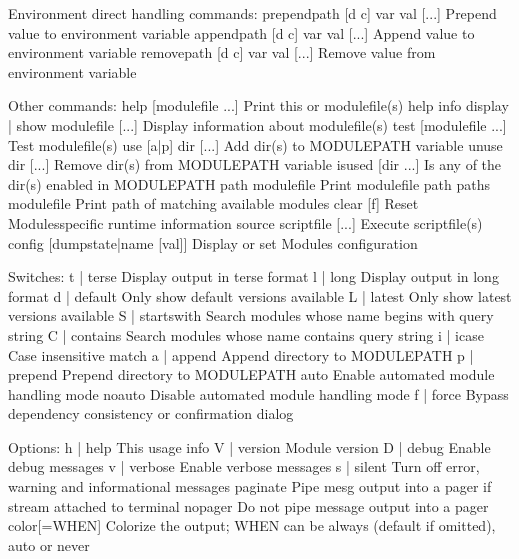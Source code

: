 \documentclass[a4paper,11pt,english]{sphinxmanual}
\begin{document}
\begin{sphinxVerbatim}[commandchars=\\\{\}]
Environment direct handling commands:
  prepend\PYGZhy{}path [\PYGZhy{}d c] var val [...] Prepend value to environment variable
  append\PYGZhy{}path [\PYGZhy{}d c] var val [...]  Append value to environment variable
  remove\PYGZhy{}path [\PYGZhy{}d c] var val [...]  Remove value from environment variable

Other commands:
  help            [modulefile ...]  Print this or modulefile(s) help info
  display | show  modulefile [...]  Display information about modulefile(s)
  test            [modulefile ...]  Test modulefile(s)
  use     [\PYGZhy{}a|\PYGZhy{}p] dir [...]         Add dir(s) to MODULEPATH variable
  unuse           dir [...]         Remove dir(s) from MODULEPATH variable
  is\PYGZhy{}used         [dir ...]         Is any of the dir(s) enabled in MODULEPATH
  path            modulefile        Print modulefile path
  paths           modulefile        Print path of matching available modules
  clear           [\PYGZhy{}f]              Reset Modules\PYGZhy{}specific runtime information
  source          scriptfile [...]  Execute scriptfile(s)
  config [\PYGZhy{}\PYGZhy{}dump\PYGZhy{}state|name [val]]  Display or set Modules configuration

Switches:
  \PYGZhy{}t | \PYGZhy{}\PYGZhy{}terse    Display output in terse format
  \PYGZhy{}l | \PYGZhy{}\PYGZhy{}long     Display output in long format
  \PYGZhy{}d | \PYGZhy{}\PYGZhy{}default  Only show default versions available
  \PYGZhy{}L | \PYGZhy{}\PYGZhy{}latest   Only show latest versions available
  \PYGZhy{}S | \PYGZhy{}\PYGZhy{}starts\PYGZhy{}with
                  Search modules whose name begins with query string
  \PYGZhy{}C | \PYGZhy{}\PYGZhy{}contains Search modules whose name contains query string
  \PYGZhy{}i | \PYGZhy{}\PYGZhy{}icase    Case insensitive match
  \PYGZhy{}a | \PYGZhy{}\PYGZhy{}append   Append directory to MODULEPATH
  \PYGZhy{}p | \PYGZhy{}\PYGZhy{}prepend  Prepend directory to MODULEPATH
  \PYGZhy{}\PYGZhy{}auto          Enable automated module handling mode
  \PYGZhy{}\PYGZhy{}no\PYGZhy{}auto       Disable automated module handling mode
  \PYGZhy{}f | \PYGZhy{}\PYGZhy{}force    By\PYGZhy{}pass dependency consistency or confirmation dialog

Options:
  \PYGZhy{}h | \PYGZhy{}\PYGZhy{}help     This usage info
  \PYGZhy{}V | \PYGZhy{}\PYGZhy{}version  Module version
  \PYGZhy{}D | \PYGZhy{}\PYGZhy{}debug    Enable debug messages
  \PYGZhy{}v | \PYGZhy{}\PYGZhy{}verbose  Enable verbose messages
  \PYGZhy{}s | \PYGZhy{}\PYGZhy{}silent   Turn off error, warning and informational messages
  \PYGZhy{}\PYGZhy{}paginate      Pipe mesg output into a pager if stream attached to terminal
  \PYGZhy{}\PYGZhy{}no\PYGZhy{}pager      Do not pipe message output into a pager
  \PYGZhy{}\PYGZhy{}color[=WHEN]  Colorize the output; WHEN can be \PYGZsq{}always\PYGZsq{} (default if
                  omitted), \PYGZsq{}auto\PYGZsq{} or \PYGZsq{}never\PYGZsq{}
\end{sphinxVerbatim}
\end{document}
